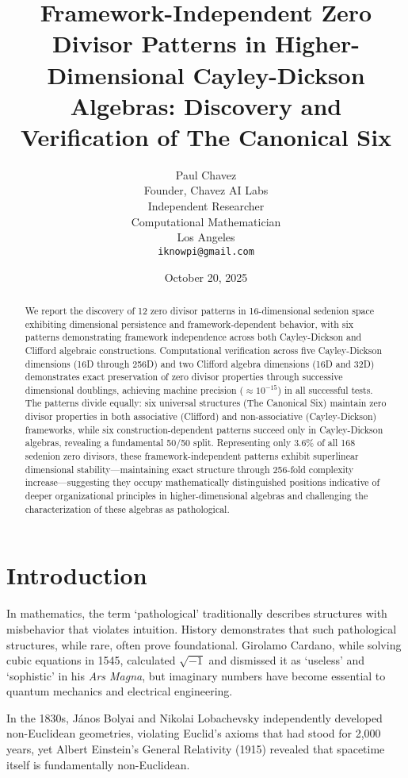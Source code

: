 \documentclass[11pt]{article}
\title{Framework-Independent Zero Divisor Patterns in Higher-Dimensional Cayley-Dickson Algebras: Discovery and Verification of The Canonical Six}
\author{
  Paul Chavez \\
  Founder, Chavez AI Labs \\
  Independent Researcher \\
  Computational Mathematician \\
  Los Angeles \\
  \texttt{iknowpi@gmail.com}
}
\date{October 20, 2025}
\begin{document}
\maketitle

\begin{abstract}
We report the discovery of 12 zero divisor patterns in 16-dimensional sedenion space exhibiting dimensional persistence and framework-dependent behavior, with six patterns demonstrating framework independence across both Cayley-Dickson and Clifford algebraic constructions. Computational verification across five Cayley-Dickson dimensions (16D through 256D) and two Clifford algebra dimensions (16D and 32D) demonstrates exact preservation of zero divisor properties through successive dimensional doublings, achieving machine precision ($\approx 10^{-15}$) in all successful tests. The patterns divide equally: six universal structures (The Canonical Six) maintain zero divisor properties in both associative (Clifford) and non-associative (Cayley-Dickson) frameworks, while six construction-dependent patterns succeed only in Cayley-Dickson algebras, revealing a fundamental 50/50 split. Representing only 3.6\% of all 168 sedenion zero divisors, these framework-independent patterns exhibit superlinear dimensional stability---maintaining exact structure through 256-fold complexity increase---suggesting they occupy mathematically distinguished positions indicative of deeper organizational principles in higher-dimensional algebras and challenging the characterization of these algebras as pathological.
\end{abstract}
\section{Introduction}
\label{sec:introduction}

In mathematics, the term `pathological' traditionally describes structures with misbehavior that violates intuition. History demonstrates that such pathological structures, while rare, often prove foundational. Girolamo Cardano, while solving cubic equations in 1545, calculated $\sqrt{-1}$ and dismissed it as `useless' and `sophistic' in his \textit{Ars Magna}, but imaginary numbers have become essential to quantum mechanics and electrical engineering.

In the 1830s, János Bolyai and Nikolai Lobachevsky independently developed non-Euclidean geometries, violating Euclid's axioms that had stood for 2,000 years, yet Albert Einstein's General Relativity (1915) revealed that spacetime itself is fundamentally non-Euclidean.
\end{document}
